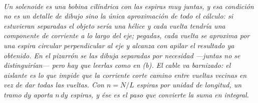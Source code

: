 \begin{center}
\\[0.5em]
{\small\itshape Un solenoide es una bobina cilíndrica con las espiras
\emph{muy} juntas, y esa condición no es un detalle de dibujo sino la única
aproximación de todo el cálculo: si estuvieran separadas el objeto sería una
hélice y cada vuelta tendría una componente de corriente a lo largo del eje;
pegadas, cada vuelta se aproxima por una espira circular perpendicular al eje y
alcanza con apilar el resultado ya obtenido. En el pizarrón se las dibuja
separadas por necesidad ---juntas no se distinguirían--- pero hay que leerlas
como en (b). El cable va barnizado: el aislante es lo que impide que la
corriente corte camino entre vueltas vecinas en vez de dar todas las vueltas.
Con $n = N/L$ espiras por unidad de longitud, un tramo $dy$ aporta $n\,dy$
espiras, y ése es el paso que convierte la suma en integral.}
\end{center}
